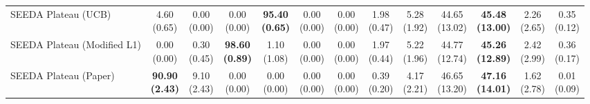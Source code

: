 \begin{table}[H]
{\begin{tabular}{l|cccccc|cccccc}
SEEDA Plateau (UCB) & \makecell{4.60 \\ (0.65)} & \makecell{0.00 \\ (0.00)} & {\cellcolor[HTML]{C8E6C9}} \makecell{0.00 \\ (0.00)} & \bfseries \makecell{95.40 \\ (0.65)} & \makecell{0.00 \\ (0.00)} & \makecell{0.00 \\ (0.00)} & \makecell{1.98 \\ (0.47)} & \makecell{5.28 \\ (1.92)} & {\cellcolor[HTML]{C8E6C9}} \makecell{44.65 \\ (13.02)} & \bfseries \makecell{45.48 \\ (13.00)} & \makecell{2.26 \\ (2.65)} & \makecell{0.35 \\ (0.12)} \\
SEEDA Plateau (Modified L1) & \makecell{0.00 \\ (0.00)} & \makecell{0.30 \\ (0.45)} & {\cellcolor[HTML]{C8E6C9}} \bfseries \makecell{98.60 \\ (0.89)} & \makecell{1.10 \\ (1.08)} & \makecell{0.00 \\ (0.00)} & \makecell{0.00 \\ (0.00)} & \makecell{1.97 \\ (0.44)} & \makecell{5.22 \\ (1.96)} & {\cellcolor[HTML]{C8E6C9}} \makecell{44.77 \\ (12.74)} & \bfseries \makecell{45.26 \\ (12.89)} & \makecell{2.42 \\ (2.99)} & \makecell{0.36 \\ (0.17)} \\
SEEDA Plateau (Paper) & \bfseries \makecell{90.90 \\ (2.43)} & \makecell{9.10 \\ (2.43)} & {\cellcolor[HTML]{C8E6C9}} \makecell{0.00 \\ (0.00)} & \makecell{0.00 \\ (0.00)} & \makecell{0.00 \\ (0.00)} & \makecell{0.00 \\ (0.00)} & \makecell{0.39 \\ (0.20)} & \makecell{4.17 \\ (2.21)} & {\cellcolor[HTML]{C8E6C9}} \makecell{46.65 \\ (13.20)} & \bfseries \makecell{47.16 \\ (14.01)} & \makecell{1.62 \\ (2.78)} & \makecell{0.01 \\ (0.09)} \\
\bottomrule
\end{tabular}
}%
\end{table}
